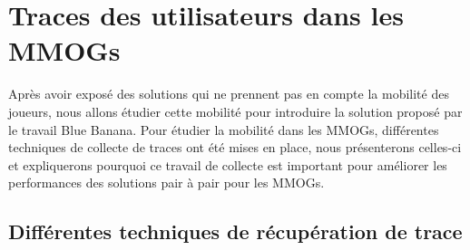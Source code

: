 \newpage
\section{Traces des utilisateurs dans les MMOGs}
	\label{trace}
 	Après avoir exposé des solutions qui ne prennent pas en compte la mobilité des joueurs, nous allons étudier cette mobilité pour introduire la solution proposé par le travail Blue Banana. Pour étudier la mobilité dans les MMOGs, différentes techniques de collecte de traces ont été mises en place, nous présenterons celles-ci et expliquerons pourquoi ce travail de collecte est important pour améliorer les performances des solutions pair à pair pour les MMOGs.
	\subsection{Différentes techniques de récupération de trace}

